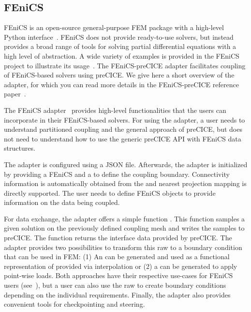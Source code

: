 \subsection{FEniCS}

FEniCS is an open-source general-purpose FEM package with a high-level Python interface~\cite{AlnaesBlechta2015a}. FEniCS does not provide ready-to-use solvers, but instead provides a broad range of tools for solving partial differential equations with a high level of abstraction. A wide variety of examples is provided in the FEniCS project to illustrate its usage~\cite{Langtangen2016}. The FEniCS-preCICE adapter facilitates coupling of FEniCS-based solvers using preCICE. We give here a short overview of the adapter, for which you can read more details in the FEniCS-preCICE reference paper~\cite{rodenberg2021fenicsprecice}.

The FEniCS adapter~\cite{Monge2018, Hertrich2019} provides high-level functionalities that the users can incorporate in their FEniCS-based solvers. For using the adapter, a user needs to understand partitioned coupling and the general approach of preCICE, but does not need to understand how to use the generic preCICE API with FEniCS data structures.

The adapter is configured using a JSON file. Afterwards, the adapter is initialized by providing a FEniCS  and a  to define the coupling boundary. Connectivity information is automatically obtained from the  and nearest projection mapping is directly supported. The user needs to define FEniCS  objects to provide information on the data being coupled.

For data exchange, the adapter offers a simple function . This function samples a given solution on the previously defined coupling mesh and writes the samples to preCICE. The function  returns the interface data provided by preCICE. The adapter provides two possibilities to transform this raw  to a boundary condition that can be used in FEM: (1) An  can be generated and used as a functional representation of provided  via interpolation or (2) a  can be generated to apply point-wise loads. Both approaches have their respective use-cases for FEniCS users (see~\cite{rodenberg2021fenicsprecice}), but a user can also use the raw  to create boundary conditions depending on the individual requirements. Finally, the adapter also provides convenient tools for checkpointing and steering.

